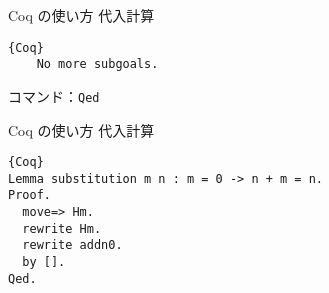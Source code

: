 \documentclass[dvipdfmx,cjk]{beamer}
\theoremstyle{mystyle}
\newcommand{\0}{\textbf{0}}
\begin{document}
\begin{frame}[fragile]{Coq の使い方 代入計算}
	\begin{screen}
		\begin{lstlisting}{Coq}
    No more subgoals.  \end{lstlisting}
	\end{screen} \pause
	コマンド：{\tt Qed}
\end{frame}

\begin{frame}[fragile]{Coq の使い方 代入計算}
	\begin{lstlisting}{Coq}
Lemma substitution m n : m = 0 -> n + m = n.
Proof.
  move=> Hm.
  rewrite Hm.
  rewrite addn0.
  by [].
Qed. \end{lstlisting}
\end{frame}
\end{document}
